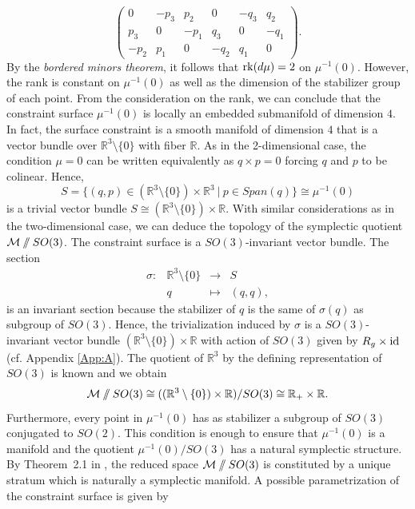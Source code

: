 \documentclass{article}
\numberwithin{equation}{section}
\theoremstyle{definition}
\newcommand{\R}{\mathbb{R}}
\newcommand{\M}{\mathcal{M}}
\newcommand{\sslash}{\mathbin{/\mkern-6mu/}}
\begin{document}
\begin{equation}
    \begin{pmatrix}
        0 & -p_3 & p_2 & 0 & -q_3 & q_2\\
        p_3 & 0 & -p_1 & q_3 & 0 & -q_1\\
        -p_2 & p_1 & 0 & -q_2 & q_1 & 0
    \end{pmatrix}.
\end{equation}
By the \emph{bordered minors theorem}, it follows that ${\rm rk}(d\mu)=2$ on $\mu^{-1}(0)$. However, the rank is constant on $\mu^{-1}(0)$ as well as the dimension of the stabilizer group of each point. From the consideration on the rank, we can conclude that the constraint surface $\mu^{-1}(0)$ is locally an embedded submanifold of dimension $4$. In fact, the surface constraint is a smooth manifold of dimension $4$ that is a vector bundle over $\R^3\setminus\{0\}$ with fiber $\R$. As in the 2-dimensional case, the condition $\mu=0$ can be written equivalently as $q\times p=0$ forcing $q$ and $p$ to be colinear. Hence,
\begin{equation}
    S=\{(q,p)\in(\R^3\setminus\{0\})\times\R^3\ |\ p\in Span(q)\}\cong \mu^{-1}(0)
\end{equation}
is a trivial vector bundle $S\cong(\R^3\setminus\{0\})\times\R$. With similar considerations as in the two-dimensional case, we can deduce the topology of the symplectic quotient $\M\sslash SO(3)$. The constraint surface is a $SO(3)$-invariant vector bundle. The section
\begin{equation}
\begin{matrix}
    \sigma:&\R^3\setminus\{0\}&\to& S\\
    & q & \mapsto & (q,q),
\end{matrix} 
\end{equation}
is an invariant section because the stabilizer of $q$ is the same of $\sigma(q)$ as subgroup of $SO(3)$. Hence, the trivialization induced by $\sigma$ is a $SO(3)$-invariant vector bundle $(\R^3\setminus\{0\})\times\R$ with action of $SO(3)$ given by $R_g\times {\rm id}$ (cf. Appendix \ref{App:A}). The quotient of $\R^3$ by the defining representation of $SO(3)$ is known and we obtain
\begin{equation}
    \M\sslash SO(3)\cong ((\R^3\setminus\{0\})\times\R)/SO(3)\cong \R_+\times \R.
\end{equation}
Furthermore, every point in $\mu^{-1}(0)$ has as stabilizer a subgroup of $SO(3)$ conjugated to $SO(2)$. This condition is enough to ensure that $\mu^{-1}(0)$ is a manifold and the quotient $\mu^{-1}(0)/SO(3)$ has a natural symplectic structure. By Theorem~2.1 in \cite{Sjamaar_Lerman_1991}, the reduced space $\M\sslash SO(3)$ is constituted by a unique stratum which is naturally a symplectic manifold. A possible parametrization of the constraint surface is given by
\end{document}
